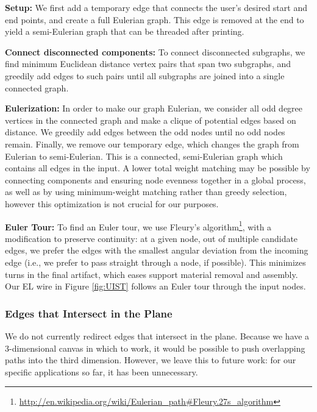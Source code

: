 {\bf Setup:} We first add a temporary edge that connects the user's desired start and end points, and create a full Eulerian graph.  This edge is removed at the end to yield a semi-Eulerian graph that can be threaded after printing.

{\bf Connect disconnected components:} To connect disconnected subgraphs, we find minimum Euclidean distance vertex pairs that span two subgraphs, and greedily add edges to such pairs until all subgraphs are joined into a single connected graph.

{\bf Eulerization:} In order to make our graph Eulerian, we consider all odd degree vertices in the connected graph and make a clique of potential edges based on distance.  We greedily add edges between the odd nodes until no odd nodes remain.  Finally, we remove our temporary edge, which changes the graph from Eulerian to semi-Eulerian.  This is a connected, semi-Eulerian graph which contains all edges in the input.
A lower total weight matching may be possible by connecting components and ensuring node evenness together in a global process, as well as by using minimum-weight matching rather than greedy selection, however this optimization is not crucial for our purposes.

{\bf Euler Tour:} To find an Euler tour, we use Fleury's algorithm\footnote{\url{http://en.wikipedia.org/wiki/Eulerian_path\#Fleury.27s_algorithm}}, with a modification to preserve continuity: at a given node, out of multiple candidate edges, we prefer the edges with the smallest angular deviation from the incoming edge (i.e., we prefer to pass straight through a node, if possible).  This minimizes turns in the final artifact, which eases support material removal and assembly.  Our EL wire in Figure \ref{fig:UIST} follows an Euler tour through the input nodes.

\subsubsection{Edges that Intersect in the Plane}
We do not currently redirect edges that intersect in the plane.  Because we have a 3-dimensional canvas in which to work, it would be possible to push overlapping paths into the third dimension.  However, we leave this to future work: for our specific applications so far, it has been unnecessary.

